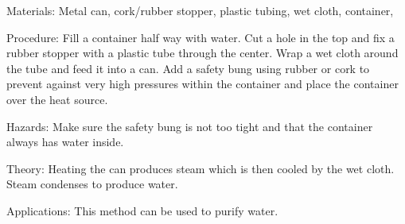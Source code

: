 \begin{multicols}{2}
\begin{description*}
\item[Materials:]{Metal can, cork/rubber stopper, plastic tubing, wet cloth, container, }
\item[Procedure:]{Fill a container half way with water. Cut a hole in the top and fix a rubber stopper with a plastic tube through the center. Wrap a wet cloth around the tube and feed it into a can. Add a safety bung using rubber or cork to prevent against very high pressures within the container and place the container over the heat source.}
\item[Hazards:]{Make sure the safety bung is not too tight and that the container always has water inside.}
\item[Theory:]{Heating the can produces steam which is then cooled by the wet cloth. Steam condenses to produce water.}
\item[Applications:]{This method can be used to purify water.}
\end{description*}



\end{multicols}

\pagebreak